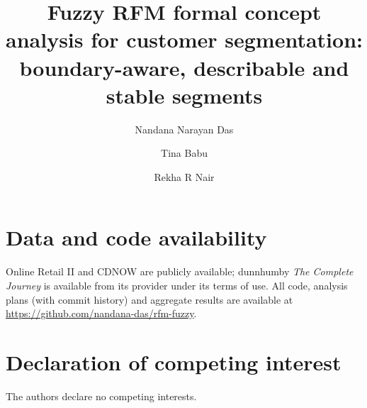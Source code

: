 \documentclass[preprint,12pt,authoryear]{elsarticle}
\begin{document}
\begin{frontmatter}

\title{Fuzzy RFM formal concept analysis for customer segmentation:\\ boundary-aware, describable and stable segments}

\author[a]{Nandana Narayan Das}
\author[a]{Tina Babu}
\author[a]{Rekha R Nair}



\end{frontmatter}









\section*{Data and code availability}
Online Retail II \citep{chen2019uci} and CDNOW \citep{fader2005} are publicly available; dunnhumby \emph{The Complete Journey} \citep{dunnhumby} is available from its provider under its terms of use. All code, analysis plans (with commit history) and aggregate results are available at \url{https://github.com/nandana-das/rfm-fuzzy}.

\section*{Declaration of competing interest}
The authors declare no competing interests.



\end{document}
